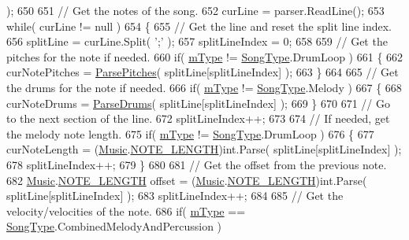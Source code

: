 \begin{DoxyCode}
      );
650 
651         \textcolor{comment}{// Get the notes of the song.}
652         curLine = parser.ReadLine();
653         \textcolor{keywordflow}{while}( curLine != null )
654         \{
655             \textcolor{comment}{// Get the line and reset the split line index.}
656             splitLine = curLine.Split( \textcolor{charliteral}{';'} );
657             splitLineIndex = 0;
658 
659             \textcolor{comment}{// Get the pitches for the note if needed.}
660             \textcolor{keywordflow}{if}( \hyperlink{group___song_priv_var_gaf3b9d0f461522324f897b746311b43c5}{mType} != \hyperlink{group___song_enums_gae681a1f001333e39fc1cb4fea97bfe1b}{SongType}.DrumLoop )
661             \{
662                 curNotePitches = \hyperlink{group___song_priv_func_gacf6fee93921e1a5edbc477c0898c357a}{ParsePitches}( splitLine[splitLineIndex] );
663             \}
664 
665             \textcolor{comment}{// Get the drums for the note if needed.}
666             \textcolor{keywordflow}{if}( \hyperlink{group___song_priv_var_gaf3b9d0f461522324f897b746311b43c5}{mType} != \hyperlink{group___song_enums_gae681a1f001333e39fc1cb4fea97bfe1b}{SongType}.Melody )
667             \{
668                 curNoteDrums = \hyperlink{group___song_priv_func_gaaa4ca12f0885a34cbfb09bb7a1db178b}{ParseDrums}( splitLine[splitLineIndex] );
669             \}
670 
671             \textcolor{comment}{// Go to the next section of the line.}
672             splitLineIndex++;
673 
674             \textcolor{comment}{// If needed, get the melody note length.}
675             \textcolor{keywordflow}{if}( \hyperlink{group___song_priv_var_gaf3b9d0f461522324f897b746311b43c5}{mType} != \hyperlink{group___song_enums_gae681a1f001333e39fc1cb4fea97bfe1b}{SongType}.DrumLoop )
676             \{
677                 curNoteLength = (\hyperlink{class_music}{Music}.\hyperlink{group___music_enums_gaf11b5f079adbb21c800b9eca1c5c3cbd}{NOTE\_LENGTH})\textcolor{keywordtype}{int}.Parse( splitLine[splitLineIndex] );
678                 splitLineIndex++;
679             \}
680 
681             \textcolor{comment}{// Get the offset from the previous note.}
682             \hyperlink{class_music}{Music}.\hyperlink{group___music_enums_gaf11b5f079adbb21c800b9eca1c5c3cbd}{NOTE\_LENGTH} offset = (\hyperlink{class_music}{Music}.\hyperlink{group___music_enums_gaf11b5f079adbb21c800b9eca1c5c3cbd}{NOTE\_LENGTH})\textcolor{keywordtype}{int}.Parse( 
      splitLine[splitLineIndex] );
683             splitLineIndex++;
684 
685             \textcolor{comment}{// Get the velocity/velocities of the note.}
686             \textcolor{keywordflow}{if}( \hyperlink{group___song_priv_var_gaf3b9d0f461522324f897b746311b43c5}{mType} == \hyperlink{group___song_enums_gae681a1f001333e39fc1cb4fea97bfe1b}{SongType}.CombinedMelodyAndPercussion )

\end{DoxyCode}
